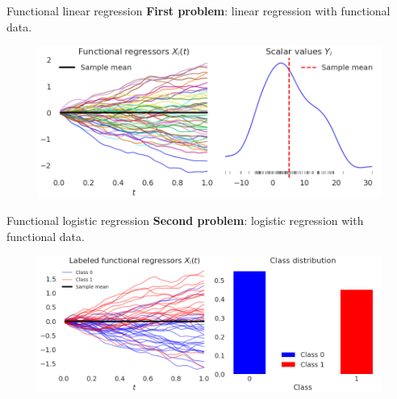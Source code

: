 \documentclass[9pt, english, professionalfonts]{beamer}
\begin{document}
\begin{frame}{Functional linear regression}
  \textbf{First problem}: linear regression with functional data.
  \vspace{2em}

\begin{figure}
    \includegraphics[width=\textwidth]{data_lin}
  \end{figure}
\end{frame}

\begin{frame}{Functional logistic regression}
  \textbf{Second problem}: logistic regression with functional data.
\vspace{2em}

\begin{figure}
    \includegraphics[width=\textwidth]{data_log}
  \end{figure}
\end{frame}
\end{document}
